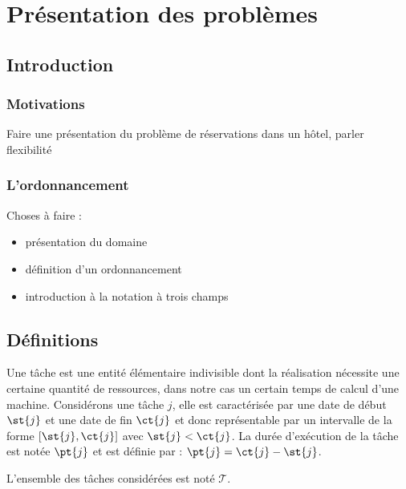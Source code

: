 \documentclass[a4paper,9pt]{book}
\begin{document}
%


\chapter{Pr\'{e}sentation des problèmes}


\section{Introduction}
\subsection{Motivations}

Faire une présentation du problème de réservations dans un hôtel, parler flexibilité

\subsection{L'ordonnancement}

Choses à faire :
\begin{itemize}
    \item présentation du domaine
    \item définition d'un ordonnancement
    \item introduction à la notation à trois champs
\end{itemize}

\section{Définitions}

\begin{ndf}[Tâche]
    Une tâche est une entité élémentaire indivisible dont la réalisation nécessite une certaine
    quantité de ressources, dans notre cas un certain temps de calcul d'une machine. Considérons une
    tâche $j$, elle est caractérisée par une date de début $\st{j}$ et une date de fin $\ct{j}$ et donc
    représentable par un intervalle de la forme $[\st{j}, \ct{j}]$ avec $\st{j} < \ct{j}$. La durée d'exécution
    de la tâche est notée $\pt{j}$ et est définie par : $\pt{j} = \ct{j} - \st{j}$.

    L'ensemble des tâches considérées est noté $\mathcal{T}$.
\end{ndf}
\end{document}
